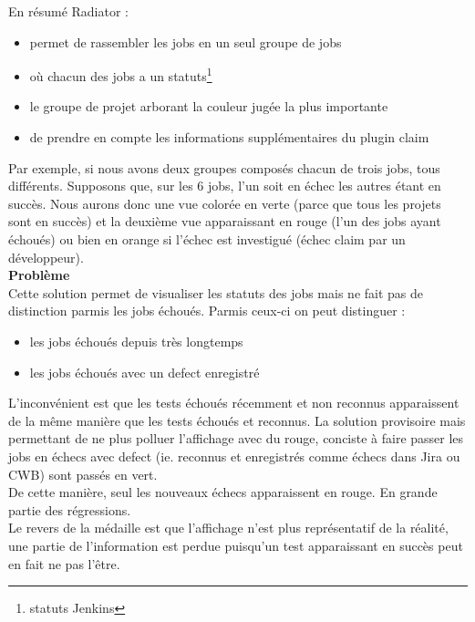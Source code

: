 En résumé Radiator :
\begin{itemize}
	\item permet de rassembler les jobs en un seul groupe de jobs
	\item où chacun des jobs a un statuts\footnote{statuts Jenkins}
	\item le groupe de projet arborant la couleur jugée la plus importante
	\item de prendre en compte les informations supplémentaires du plugin claim
\end{itemize}
Par exemple, si nous avons deux groupes composés chacun de trois jobs, tous différents. Supposons que, sur les 6 jobs, l'un soit en échec les autres étant en succès. Nous aurons donc une vue colorée en verte (parce que tous les projets sont en succès) et la deuxième vue apparaissant en rouge (l'un des jobs ayant échoués) ou bien en orange si l'échec est investigué (échec claim par un développeur).\\




\textbf{Problème}\hfill \\ \indent
Cette solution permet de visualiser les statuts des jobs mais ne fait pas de distinction parmis les jobs échoués. Parmis ceux-ci on peut distinguer :

\begin{itemize}
	\item les jobs échoués depuis très longtemps
	\item les jobs échoués avec un defect enregistré
\end{itemize}
L'inconvénient est que les tests échoués récemment et non reconnus apparaissent de la même manière que les tests échoués et reconnus. La solution provisoire mais permettant de ne plus polluer l'affichage avec du rouge, conciste à faire passer les jobs en échecs avec defect (ie. reconnus et enregistrés comme échecs dans Jira ou CWB) sont passés en vert.\\
De cette manière, seul les nouveaux échecs apparaissent en rouge. En grande partie des régressions.\\
Le revers de la médaille est que l'affichage n'est plus représentatif de la réalité, une partie de l'information est perdue puisqu'un test apparaissant en succès peut en fait ne pas l'être.\\




